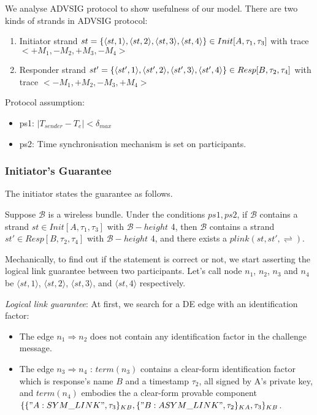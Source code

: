 We analyse ADVSIG protocol to show usefulness of our model. There are two kinds of strands in ADVSIG protocol:
\begin{enumerate}
\item Initiator strand $st =  \{\langle st, 1 \rangle,\langle st, 2 \rangle,\langle st, 3 \rangle,\langle st, 4 \rangle\}\\ \in Init[A,\tau_1,\tau_3]$ with trace $<+M_1, -M_2 , +M_3,-M_4>$
\item Responder strand $st' = \{\langle st', 1 \rangle,\langle st', 2 \rangle,\langle st', 3 \rangle,\langle st', 4 \rangle\} \\ \in Resp[B,\tau_2,\tau_4]$ with trace $<-M_1, +M_2 , -M_3,+M_4>$
\end{enumerate}

Protocol assumption: 
\begin{itemize}
\item ps1: $|T_{sender} - T_e| < \delta_{max}$
\item ps2: Time synchronisation mechanism is set on participants.
\end{itemize}

\subsubsection*{Initiator's Guarantee} 

The initiator states the guarantee as follows.

Suppose $\mathcal{B}$ is a wireless bundle. Under the conditions $ps1, ps2$, if $\mathcal{B}$ contains a strand $st \in Init[A,\tau_1,\tau_3]$ with $\mathcal{B} -height$ 4, then $\mathcal{B}$ contains a strand $st' \in Resp[B,\tau_2,\tau_4]$ with $\mathcal{B} -height$ 4, and there exists a $plink(st,st',\rightleftharpoons)$. 

Mechanically, to find out if the statement is correct or not, we start asserting the logical link guarantee between two participants. Let's call node $n_1$,  $n_2$, $n_3$ and $n_4$ be $\langle st,1\rangle$, $\langle st,2\rangle$, $\langle st,3\rangle$, and $\langle st,4\rangle$ respectively. 
 
\emph{Logical link guarantee}: At first, we search for a DE edge with an identification factor:
\begin{itemize}
\item The edge $n_1 \Rightarrow n_2$ does not contain any identification factor in the challenge message. 
\item The edge $n_3 \Rightarrow n_4$ : $term(n_3)$ contains a clear-form identification factor which is response's name $B$ and a timestamp $\tau_2$, all signed by A's private key, and $term(n_4)$ embodies the a clear-form provable component $\{\{ "A:SYM\_LINK", \tau_3\}_{KB} ,\{ "B:ASYM\_LINK",\tau_2\}_{KA} ,\tau_3\}_{KB}$.
\end{itemize}

